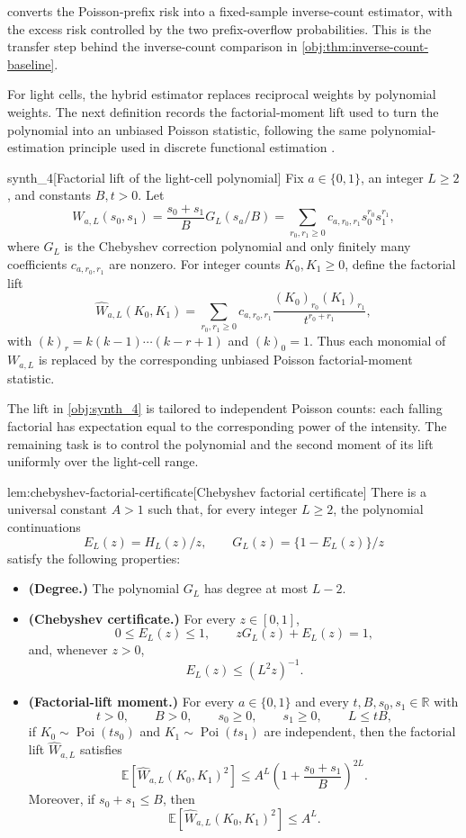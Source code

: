  converts the Poisson-prefix risk into a fixed-sample inverse-count estimator, with the excess risk controlled by the two prefix-overflow probabilities. This is the transfer step behind the inverse-count comparison in \cref{obj:thm:inverse-count-baseline}.

For light cells, the hybrid estimator replaces reciprocal weights by polynomial weights. The next definition records the factorial-moment lift used to turn the polynomial into an unbiased Poisson statistic, following the same polynomial-estimation principle used in discrete functional estimation \citep{JiaoVenkatHanWeissman2015,WuYang2016,ValiantValiant2017,OrlitskySureshWu2016}.

\begin{definitionv}{synth_4}[Factorial lift of the light-cell polynomial]
Fix \(a\in\{0,1\}\), an integer \(L\ge2\), and constants \(B,t>0\). Let
\[
W_{a,L}(s_0,s_1)
=
\frac{s_0+s_1}{B}G_L(s_a/B)
=
\sum_{r_0,r_1\ge0}c_{a,r_0,r_1}s_0^{r_0}s_1^{r_1},
\]
where \(G_L\) is the Chebyshev correction polynomial and only finitely many coefficients \(c_{a,r_0,r_1}\) are nonzero. For integer counts \(K_0,K_1\ge0\), define the factorial lift
\[
\widehat W_{a,L}(K_0,K_1)
=
\sum_{r_0,r_1\ge0}
c_{a,r_0,r_1}
\frac{(K_0)_{r_0}(K_1)_{r_1}}{t^{r_0+r_1}},
\]
with \((k)_r=k(k-1)\cdots(k-r+1)\) and \((k)_0=1\). Thus each monomial of \(W_{a,L}\) is replaced by the corresponding unbiased Poisson factorial-moment statistic.
\end{definitionv}

The lift in \cref{obj:synth_4} is tailored to independent Poisson counts: each falling factorial has expectation equal to the corresponding power of the intensity. The remaining task is to control the polynomial and the second moment of its lift uniformly over the light-cell range.

\begin{lemmav}{lem:chebyshev-factorial-certificate}[Chebyshev factorial certificate]
There is a universal constant \(A>1\) such that, for every integer \(L\ge2\), the polynomial continuations
\[
E_L(z)=H_L(z)/z,
\qquad
G_L(z)=\{1-E_L(z)\}/z
\]
satisfy the following properties:
\begin{itemize}
\item \textbf{(Degree.)} The polynomial \(G_L\) has degree at most \(L-2\).
\item \textbf{(Chebyshev certificate.)} For every \(z\in[0,1]\),
\[
0\le E_L(z)\le 1,
\qquad
zG_L(z)+E_L(z)=1,
\]
and, whenever \(z>0\),
\[
E_L(z)\le (L^2z)^{-1}.
\]
\item \textbf{(Factorial-lift moment.)} For every \(a\in\{0,1\}\) and every \(t,B,s_0,s_1\in\mathbb R\) with
\[
t>0,\qquad B>0,\qquad s_0\ge0,\qquad s_1\ge0,\qquad L\le tB,
\]
if \(K_0\sim\operatorname{Poi}(ts_0)\) and \(K_1\sim\operatorname{Poi}(ts_1)\) are independent, then the factorial lift \(\widehat W_{a,L}\) satisfies
\[
\mathbb E\!\left[\widehat W_{a,L}(K_0,K_1)^2\right]
\le
A^L\left(1+\frac{s_0+s_1}{B}\right)^{2L}.
\]
Moreover, if \(s_0+s_1\le B\), then
\[
\mathbb E\!\left[\widehat W_{a,L}(K_0,K_1)^2\right]\le A^L.
\]
\end{itemize}
\end{lemmav}

